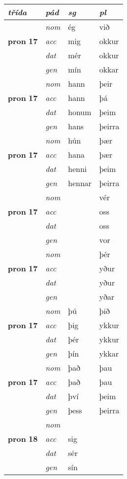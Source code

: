 \begin{longtable}[l]{X>{\footnotesize\itshape}XXX}
 {\textbf{\textit{třída}}} & {\textit{pád}}   & \textit{sg} & \textit{pl}  \\ \cmidrule{1-4}
\endhead
\multirow{3}{*}{{{\textbf{pron} \Large{\textbf{17}}}}}  &  nom & ég & við   \\*
 & acc &  mig  & okkur  \\*
 & dat & mér & okkur   \\*
 & gen & mín  & okkar  \\
\cmidrule{2-4}

\multirow{3}{*}{{{\textbf{pron} \Large{\textbf{17}}}}}  &  nom & hann & þeir   \\*
 & acc &  hann  & þá  \\*
 & dat & honum & þeim   \\*
 & gen & hans  & þeirra  \\
\cmidrule{2-4}

\multirow{3}{*}{{{\textbf{pron} \Large{\textbf{17}}}}}  &  nom & hún & þær   \\*
 & acc &  hana  & þær  \\*
 & dat & henni & þeim   \\*
 & gen & hennar  & þeirra  \\
\cmidrule{2-4}

\multirow{3}{*}{{{\textbf{pron} \Large{\textbf{17}}}}}  &  nom &  & vér   \\*
 & acc &    & oss  \\*
 & dat &  & oss   \\*
 & gen &   & vor  \\
\cmidrule{2-4}

\multirow{3}{*}{{{\textbf{pron} \Large{\textbf{17}}}}}  &  nom &  & þér   \\*
 & acc &    & yður  \\*
 & dat &  & yður   \\*
 & gen &   & yðar  \\
\cmidrule{2-4}

\multirow{3}{*}{{{\textbf{pron} \Large{\textbf{17}}}}}  &  nom & þú & þið   \\*
 & acc &  þig  & ykkur  \\*
 & dat & þér & ykkur   \\*
 & gen & þín  & ykkar  \\
\cmidrule{2-4}

\multirow{3}{*}{{{\textbf{pron} \Large{\textbf{17}}}}}  &  nom & það & þau   \\*
 & acc &  það  & þau  \\*
 & dat & því & þeim   \\*
 & gen & þess  & þeirra  \\
\cmidrule{2-4}

\multirow{3}{*}{{{\textbf{pron} \Large{\textbf{18}}}}}  &  nom &  &    \\*
 & acc &  sig  &   \\*
 & dat & sér &    \\*
 & gen & sín  &   \\
\cmidrule{2-4}
\bottomrule
\end{longtable}
